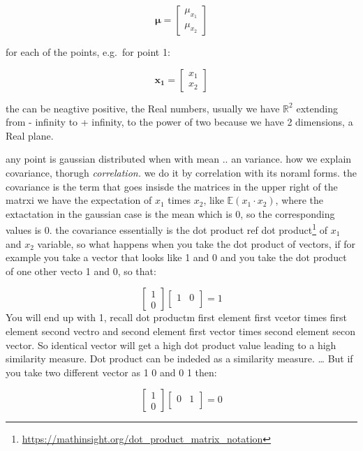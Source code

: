 \documentclass[
  12pt,
  a4paper,
  oneside]{book}
\DeclareRobustCommand{\href}[2]{#2\footnote{\url{#1}}}
\theoremstyle{definition}
\theoremstyle{definition}
\theoremstyle{definition}
\theoremstyle{remark}
\begin{document}
\[
\boldsymbol{\mu}=\left[\begin{array}{l}
\mu_{x_1} \\
\mu_{x_2}
\end{array}\right]
\]

for each of the points, e.g.~for point 1:

\[
\mathbf{x_1}=\left[\begin{array}{l}
x_1 \\
x_2
\end{array}\right]
\]

the can be neagtive positive, the Real numbers, usually we have \(\mathbb{R}^{2}\) extending from - infinity to + infinity, to the power of two because we have 2 dimensions, a Real plane.

any point is gaussian distributed when with mean .. an variance.
how we explain covariance, thorugh \emph{correlation.}
we do it by correlation with its noraml forms. the covariance is the term that goes insisde the matrices in the upper right of the matrxi we have the expectation of \(x_1\) times \(x_2\), like \(\mathbb{E}(x_1 \cdot x_2)\), where the extactation in the gaussian case is the mean which is 0, so the corresponding values is 0.
the covariance essentially is the dot product \href{https://mathinsight.org/dot_product_matrix_notation}{ref dot product} of \(x_1\) and \(x_2\) variable, so what happens when you take the dot product of vectors,
if for example you take a vector that looks like 1 and 0 and you take the dot product of one other vecto 1 and 0, so that:

\[
\left[\begin{array}{l}
1 \\
0
\end{array}\right]\left[\begin{array}{l}
1 & 0 \\
\end{array}\right] = 1
\]
You will end up with 1, recall dot productm first element first vcetor times first element second vectro and second element first vector times second element secon vector. So identical vector will get a high dot product value leading to a high similarity measure. Dot product can be indeded as a similarity measure.
\ldots{} But if you take two different vector as 1 0 and 0 1 then:

\[
\left[\begin{array}{l}
1 \\
0
\end{array}\right]\left[\begin{array}{l}
0 & 1 \\
\end{array}\right] = 0
\]
\end{document}
